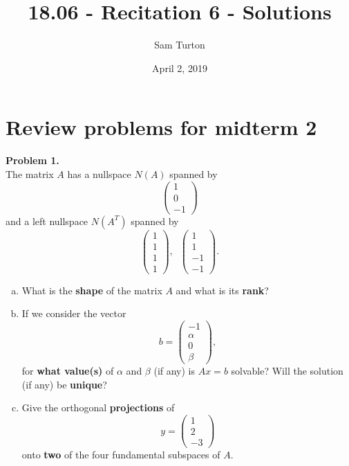 \documentclass[11pt]{article}
\title{18.06 - Recitation 6 - Solutions}
\author{Sam Turton}
\date{April 2, 2019}
\begin{document}
\maketitle

\section{Review problems for midterm 2}

\noindent \textbf{Problem 1.}\\
The matrix $A$ has a nullspace $N(A)$ spanned by 
$$\begin{pmatrix} 1 \\ 0 \\ -1 \end{pmatrix}$$
and a left nullspace $N(A^T)$ spanned by
$$\begin{pmatrix} 1 \\ 1 \\ 1 \\ 1 \end{pmatrix}, \;\; \begin{pmatrix} 1 \\ 1 \\ -1 \\ -1 \end{pmatrix}.$$
\begin{enumerate}[(a)]
\item What is the \textbf{shape} of the matrix $A$ and what is its \textbf{rank}?
\item If we consider the vector 
$$b = \begin{pmatrix} -1 \\ \alpha \\ 0 \\ \beta \end{pmatrix},$$
for \textbf{what value(s)} of $\alpha$ and $\beta$ (if any) is $Ax = b$ solvable? Will the solution (if any) be \textbf{unique}?
\item Give the orthogonal \textbf{projections} of 
$$y = \begin{pmatrix} 1 \\ 2 \\ -3 \end{pmatrix}$$
onto \textbf{two} of the four fundamental subspaces of $A$. 
\end{enumerate}

\
\end{document}
